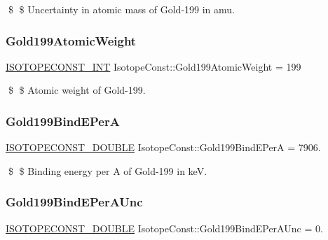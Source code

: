 \$ \$ Uncertainty in atomic mass of Gold-\/199 in amu. \mbox{\label{group___isotope_const-_gold-_au199_gae7dd30be77fd94bb81c64daf10d51b3e}} 
\subsubsection{\texorpdfstring{Gold199\+Atomic\+Weight}{Gold199AtomicWeight}}
{\footnotesize\ttfamily \mbox{\hyperlink{group___isotope_const-_macros_ga5f18360b3e99483a35c32d789e62621c}{I\+S\+O\+T\+O\+P\+E\+C\+O\+N\+S\+T\+\_\+\+I\+NT}} Isotope\+Const\+::\+Gold199\+Atomic\+Weight = 199}

\$ \$ Atomic weight of Gold-\/199. \mbox{\label{group___isotope_const-_gold-_au199_ga92f361083a091f6c5b9c2fc5c3642e53}} 
\subsubsection{\texorpdfstring{Gold199\+Bind\+E\+PerA}{Gold199BindEPerA}}
{\footnotesize\ttfamily \mbox{\hyperlink{group___isotope_const-_macros_ga8f45a7272ce02c0b4c65c44636ed719a}{I\+S\+O\+T\+O\+P\+E\+C\+O\+N\+S\+T\+\_\+\+D\+O\+U\+B\+LE}} Isotope\+Const\+::\+Gold199\+Bind\+E\+PerA = 7906.}

\$ \$ Binding energy per A of Gold-\/199 in keV. \mbox{\label{group___isotope_const-_gold-_au199_ga741d25a8f2ccb4df41433b7fcc9bd214}} 
\subsubsection{\texorpdfstring{Gold199\+Bind\+E\+Per\+A\+Unc}{Gold199BindEPerAUnc}}
{\footnotesize\ttfamily \mbox{\hyperlink{group___isotope_const-_macros_ga8f45a7272ce02c0b4c65c44636ed719a}{I\+S\+O\+T\+O\+P\+E\+C\+O\+N\+S\+T\+\_\+\+D\+O\+U\+B\+LE}} Isotope\+Const\+::\+Gold199\+Bind\+E\+Per\+A\+Unc = 0.}


